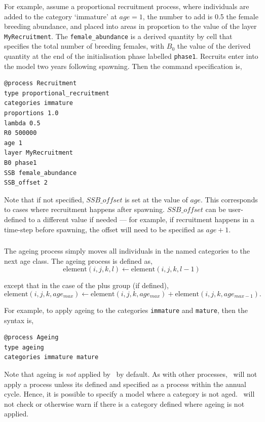 For example, assume a proportional recruitment process, where individuals are added to the category `immature' at $age=1$, the number to add is 0.5 the female breeding abundance, and placed into areas in proportion to the value of the layer \texttt{MyRecruitment}. The \texttt{female\_abundance} is a derived quantity by cell that specifies the total number of breeding females, with $B_0$ the value of the derived quantity at the end of the initialisation phase labelled \texttt{phase1}. Recruits enter into the model two years following spawning. Then the command specification is,
{\small{\begin{verbatim}
@process Recruitment
type proportional_recruitment
categories immature
proportions 1.0
lambda 0.5
R0 500000
age 1
layer MyRecruitment
B0 phase1
SSB female_abundance
SSB_offset 2
\end{verbatim}}}

Note that if not specified, $SSB\_offset$ is set at the value of $age$. This corresponds to cases where recruitment happens after spawning. $SSB\_offset$ can be user-defined to a different value if needed --- for example, if recruitment happens in a time-step before spawning, the offset will need to be specified as $age + 1$.

\subsubsection{\label{sec:ageing}}

The ageing process simply moves all individuals in the named categories to the next age class. The ageing process is defined as,
\begin{equation}
  \text{element}(i,j,k,l) \leftarrow \text{element}(i,j,k,l-1)
\end{equation}

except that in the case of the plus group (if defined), 
\begin{equation}
  \text{element}(i,j,k,age_{max}) \leftarrow \text{element}(i,j,k,age_{max}) + \text{element}(i,j,k,age_{max-1}).
\end{equation}

For example, to apply ageing to the categories \texttt{immature} and \texttt{mature}, then the syntax is,
{\small{\begin{verbatim}
@process Ageing
type ageing
categories immature mature
\end{verbatim}}}

Note that ageing is \emph{not} applied by \SPM\ by default. As with other processes, \SPM\ will not apply a process unless its defined and specified as a process within the annual cycle. Hence, it is possible to specify a model where a category is not aged. \SPM\ will not check or otherwise warn if there is a category defined where ageing is not applied.

